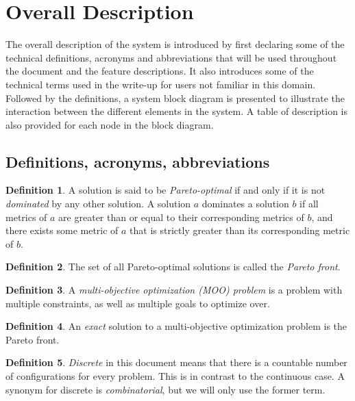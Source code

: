 \documentclass[11pt]{article}
\theoremstyle{definition}
\newtheorem{mydef}{Definition}
\begin{document}
\section{Overall Description}\label{sec:overall_desc}
The overall description of the system is introduced by first declaring some of the technical definitions, acronyms and abbreviations that will be used throughout the document and the feature descriptions. It also introduces some of the technical terms used in the write-up for users not familiar in this domain. Followed by the definitions, a system block diagram is presented to illustrate the interaction between the different elements in the system. A table of description is also provided for each node in the block diagram.

\subsection{Definitions, acronyms, abbreviations}\label{sec:def}

\begin{mydef}
A solution is said to be \textit{Pareto-optimal} if and only if it is
not \textit{dominated} by any other solution. A solution $a$ dominates
a solution $b$ if all metrics of $a$ are greater than or equal to their
corresponding metrics of $b$, and there exists some metric of $a$ that
is strictly greater than its corresponding metric of $b$.
\end{mydef}

\begin{mydef}
The set of all Pareto-optimal solutions is called the
\textit{Pareto front}.
\end{mydef}

\begin{mydef}
A \textit{multi-objective optimization (MOO) problem} is a problem with
multiple constraints, as well as multiple goals to optimize over.
\end{mydef}

\begin{mydef}
An \textit{exact} solution to a multi-objective optimization problem is
the Pareto front.
\end{mydef}

\begin{mydef}
\textit{Discrete} in this document means that there is a countable
number of configurations for every problem. This is in contrast to the
continuous case. A synonym for discrete is \textit{combinatorial}, but
we will only use the former term.  \end{mydef}
\end{document}
